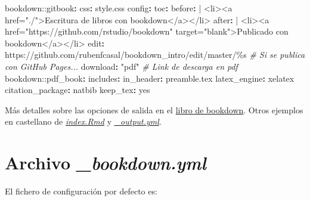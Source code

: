 \documentclass[
]{book}
\newenvironment{Shaded}{\begin{snugshade}}{\end{snugshade}}
\newcommand{\AttributeTok}[1]{\textcolor[rgb]{0.77,0.63,0.00}{#1}}
\newcommand{\CharTok}[1]{\textcolor[rgb]{0.31,0.60,0.02}{#1}}
\newcommand{\CommentTok}[1]{\textcolor[rgb]{0.56,0.35,0.01}{\textit{#1}}}
\newcommand{\FunctionTok}[1]{\textcolor[rgb]{0.00,0.00,0.00}{#1}}
\newcommand{\KeywordTok}[1]{\textcolor[rgb]{0.13,0.29,0.53}{\textbf{#1}}}
\newcommand{\NormalTok}[1]{#1}
\newcommand{\StringTok}[1]{\textcolor[rgb]{0.31,0.60,0.02}{#1}}
\theoremstyle{definition}
\theoremstyle{definition}
\theoremstyle{definition}
\theoremstyle{definition}
\theoremstyle{remark}
\begin{document}
\begin{Shaded}
\begin{Highlighting}[]
\AttributeTok{bookdown:}\FunctionTok{:gitbook}\KeywordTok{:}
\AttributeTok{  }\FunctionTok{css}\KeywordTok{:}\AttributeTok{ style.css}
\AttributeTok{  }\FunctionTok{config}\KeywordTok{:}
\AttributeTok{    }\FunctionTok{toc}\KeywordTok{:}
\FunctionTok{      before}\KeywordTok{: }\CharTok{|}
\NormalTok{        \textless{}li\textgreater{}\textless{}a href="./"\textgreater{}Escritura de libros con bookdown\textless{}/a\textgreater{}\textless{}/li\textgreater{}}
\FunctionTok{      after}\KeywordTok{: }\CharTok{|}
\NormalTok{        \textless{}li\textgreater{}\textless{}a href="https://github.com/rstudio/bookdown" target="blank"\textgreater{}Publicado con bookdown\textless{}/a\textgreater{}\textless{}/li\textgreater{}}
\AttributeTok{    }\FunctionTok{edit}\KeywordTok{:}\AttributeTok{ https://github.com/rubenfcasal/bookdown\_intro/edit/master/\%s}\CommentTok{      \# Si se publica con GitHub Pages...}
\AttributeTok{    }\FunctionTok{download}\KeywordTok{:}\AttributeTok{ }\StringTok{"pdf"}\CommentTok{                                                         \# Link de descarga en pdf}
\AttributeTok{bookdown:}\FunctionTok{:pdf\_book}\KeywordTok{:}
\AttributeTok{  }\FunctionTok{includes}\KeywordTok{:}
\AttributeTok{    }\FunctionTok{in\_header}\KeywordTok{:}\AttributeTok{ preamble.tex}
\AttributeTok{  }\FunctionTok{latex\_engine}\KeywordTok{:}\AttributeTok{ xelatex}
\AttributeTok{  }\FunctionTok{citation\_package}\KeywordTok{:}\AttributeTok{ natbib}
\AttributeTok{  }\FunctionTok{keep\_tex}\KeywordTok{:}\AttributeTok{ }\CharTok{yes}
\end{Highlighting}
\end{Shaded}

Más detalles sobre las opciones de salida en el \href{https://bookdown.org/yihui/bookdown/output-formats.html}{libro de bookdown}.
Otros ejemplos en castellano de
\href{https://github.com/rubenfcasal/simbook/raw/master/index.Rmd}{\emph{index.Rmd}} y
\href{https://github.com/rubenfcasal/simbook/blob/master/_output.yml}{\emph{\_output.yml}}.

\hypertarget{archivo-_bookdown.yml}{%
\section{\texorpdfstring{Archivo \emph{\_bookdown.yml}}{Archivo \_bookdown.yml}}\label{archivo-_bookdown.yml}}

El fichero de configuración por defecto es:
\end{document}
